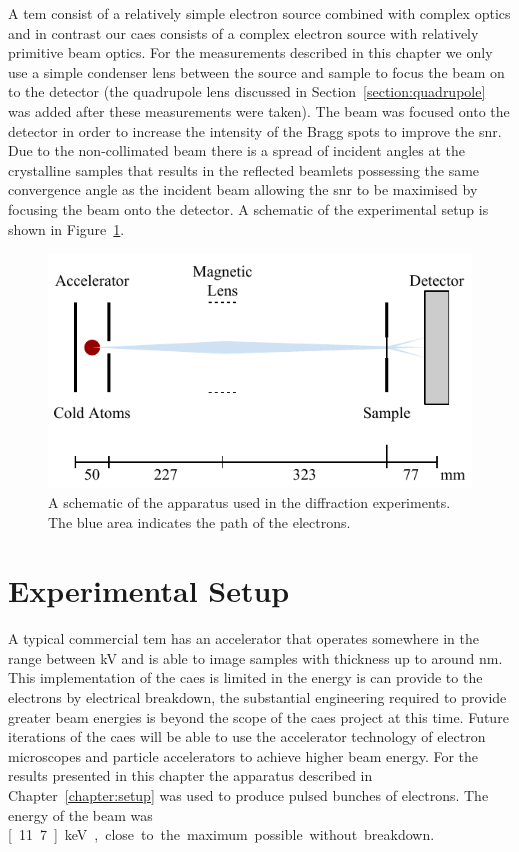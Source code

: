 A \gls{tem} consist of a relatively simple electron source combined with complex optics and in contrast our \gls{caes} consists of a complex electron source with relatively primitive beam optics.
For the measurements described in this chapter we only use a simple condenser lens between the source and sample to focus the beam on to the detector (the quadrupole lens discussed in Section~\ref{section:quadrupole} was added after these measurements were taken).
The beam was focused onto the detector in order to increase the intensity of the Bragg spots to improve the \gls{snr}.
Due to the non-collimated beam there is a spread of incident angles at the crystalline samples that results in the reflected beamlets possessing the same convergence angle as the incident beam allowing the \gls{snr} to be maximised by focusing the beam onto the detector.
A schematic of the experimental setup is shown in Figure~\ref{figure:diffraction_geometry}.

\begin{figure}
    \center
    \includegraphics{part2/Figs/DiffractionGeometry.pdf}
    \caption[A schematic of the apparatus used for diffraction experiments.]{A schematic of the apparatus used in the diffraction experiments. The blue area indicates the path of the electrons.}
    \label{figure:diffraction_geometry}
\end{figure}

\section{Experimental Setup}

A typical commercial \gls{tem} has an accelerator that operates somewhere in the range between \unit[50-300]{kV} and is able to image samples with thickness up to around \unit[200]{nm}.
This implementation of the \gls{caes} is limited in the energy is can provide to the electrons by electrical breakdown, the substantial engineering required to provide greater beam energies is beyond the scope of the \gls{caes} project at this time.
Future iterations of the \gls{caes} will be able to use the accelerator technology of electron microscopes and particle accelerators to achieve higher beam energy.
For the results presented in this chapter the apparatus described in Chapter~\ref{chapter:setup} was used to produce pulsed bunches of electrons.
The energy of the beam was \unit[11.7]{keV}, close to the maximum possible without breakdown.

